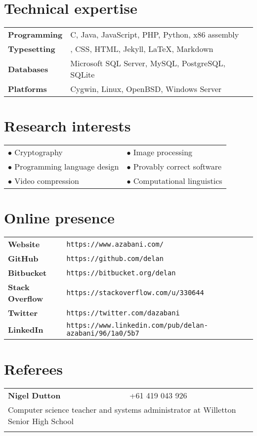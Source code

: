 \documentclass[a4paper,12pt]{article}
\begin{document}
\newpage

\section*{Technical expertise}

\begin{tabular}{p{3.5cm}p{12.5cm}}
	\textbf{Programming} &
		C, Java, JavaScript, PHP, Python, x86 assembly \\
	\textbf{Typesetting} &
		\hologo{BibTeX}, CSS, HTML, Jekyll, \LaTeX, Markdown \\
	\textbf{Databases} &
		Microsoft SQL Server, MySQL, PostgreSQL, SQLite \\
	\textbf{Platforms} &
		Cygwin, Linux, OpenBSD, Windows Server
\end{tabular}

\section*{Research interests}

\begin{tabular}{p{8cm}p{8cm}}
	$\bullet$ Cryptography &
	$\bullet$ Image processing \\
	$\bullet$ Programming language design &
	$\bullet$ Provably correct software \\
	$\bullet$ Video compression &
	$\bullet$ Computational linguistics
\end{tabular}

\section*{Online presence}

\begin{tabular}{p{3.5cm}p{12.5cm}}
	\textbf{Website} &
		\texttt{https://www.azabani.com/}\\
	\textbf{GitHub} &
		\texttt{https://github.com/delan}\\
	\textbf{Bitbucket} &
		\texttt{https://bitbucket.org/delan}\\
	\textbf{Stack Overflow} &
		\texttt{https://stackoverflow.com/u/330644}\\
	\textbf{Twitter} &
		\texttt{https://twitter.com/dazabani}\\
	\textbf{LinkedIn} &
		\texttt{https://www.linkedin.com/pub/delan-azabani/96/1a0/5b7}
\end{tabular}

\section*{Referees}

\begin{tabular}{p{3.5cm}p{12.5cm}}
	\textbf{Nigel Dutton} &
		+61 419 043 926\\
	\multicolumn{2}{p{17cm}}{
		Computer science teacher and systems administrator
		at Willetton Senior High School
	}\\\\
\end{tabular}
\end{document}
